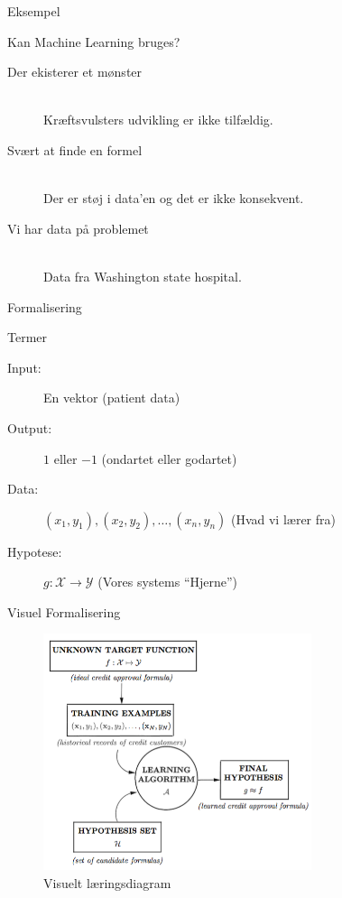 \documentclass[12pt,t]{beamer}
\begin{document}
    \begin{frame}[t]{Eksempel}
        \begin{block}{Kan Machine Learning bruges?}
        \begin{description}
            \item[\alert{Der ekisterer et mønster}]~\\
            Kræftsvulsters udvikling er ikke tilfældig.

            \pause
            \item[\alert{Svært at finde en formel}]~\\
            Der er støj i data'en og det er ikke konsekvent.

            \pause
            \item[\alert{Vi har data på problemet}]~\\
            Data fra Washington state hospital.
        \end{description}
        \end{block}
    \end{frame}


    \begin{frame}[c]{Formalisering}
        \begin{block}{Termer}
            \begin{description}
                \item[Input:] En vektor (patient data)  \pause
                \item[Output:] $1$ eller $-1$ (ondartet eller godartet) \pause
                \item[Data:] $(x_1,y_1), (x_2,y_2),\dots,(x_n,y_n)$
                (Hvad vi lærer fra) \pause
                \item[Hypotese:] $g: \mathcal{X} \rightarrow
                                   \mathcal{Y}$ (Vores systems ``Hjerne'')
            \end{description}
        \end{block}
    \end{frame}

    \begin{frame}[c]{Visuel Formalisering}
            \begin{figure}[h!]
                \caption{Visuelt læringsdiagram}
                \centering
                \includegraphics[width=0.7\textwidth]{include/dia.png}
            \end{figure}
    \end{frame}
\end{document}
